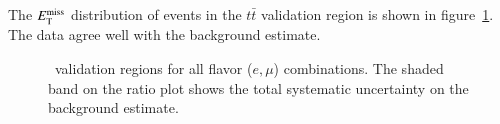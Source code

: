 
The $E_{\text{T}}^{\text{miss}}$ distribution of events in the $t\bar{t}$ validation region is shown in figure~\ref{fig:model-independent-VR-ttbar}. The data agree well with the background estimate.

\begin{figure}[tbp]
  \centering
  \caption{\ttbar\ validation regions for all flavor ($e, \mu$) combinations. The shaded band on the ratio plot shows the total systematic uncertainty on the background estimate.}
  \label{fig:model-independent-VR-ttbar}
\end{figure}


